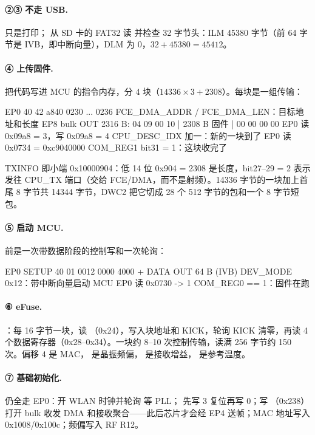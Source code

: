 \paragraph{②③ 不走 USB.}  只是打印； 从 SD 卡的 FAT32 读  并检查 32 字节头：ILM 45380 字节（前 64 字节是 IVB，即中断向量），DLM 为 0，$32+45380=45412$。

\paragraph{④ 上传固件.}  把代码写进 MCU 的指令内存，分 4 块（$14336\times 3 + 2308$）。每块是一组传输：
\begin{txtcode}
EP0  40 42 a840 0230 ... 0236   FCE_DMA_ADDR / FCE_DMA_LEN：目标地址和长度
EP8  bulk OUT 2316 B:  04 09 00 10 | 2308 B 固件 | 00 00 00 00
EP0  读 0x09a8 = 3，写 0x09a8 = 4   CPU_DESC_IDX 加一：新的一块到了
EP0  读 0x0734 = 0xc9040000        COM_REG1 bit31 = 1：这块收完了
\end{txtcode}
TXINFO  即小端 0x10000904：低 14 位 0x904 = 2308 是长度，bit27--29 = 2 表示发往 CPU\_TX 端口（交给 FCE/DMA，而不是射频）。14336 字节的一块加上首尾 8 字节共 14344 字节，DWC2 把它切成 28 个 512 字节的包和一个 8 字节短包。

\paragraph{⑤ 启动 MCU.}  前是一次带数据阶段的控制写和一次轮询：
\begin{txtcode}
EP0  SETUP 40 01 0012 0000 4000 + DATA OUT 64 B (IVB)   DEV_MODE 0x12：带中断向量启动 MCU
EP0  读 0x0730 -> 1                                     COM_REG0 == 1：固件在跑
\end{txtcode}

\paragraph{⑥ eFuse.} ：每 16 字节一块，读 （0x24），写入块地址和 KICK，轮询 KICK 清零，再读 4 个数据寄存器（0x28--0x34）。一块约 8--10 次控制传输，读满 256 字节约 150 次。偏移 4 是 MAC， 是晶振频偏， 是接收增益， 是参考温度。

\paragraph{⑦ 基础初始化.}  仍全走 EP0：开 WLAN 时钟并轮询  等 PLL； 先写 3 复位再写 0；写 （0x238）打开 bulk 收发 DMA 和接收聚合——此后芯片才会经 EP4 送帧；MAC 地址写入 0x1008/0x100c；频偏写入 RF R12。

